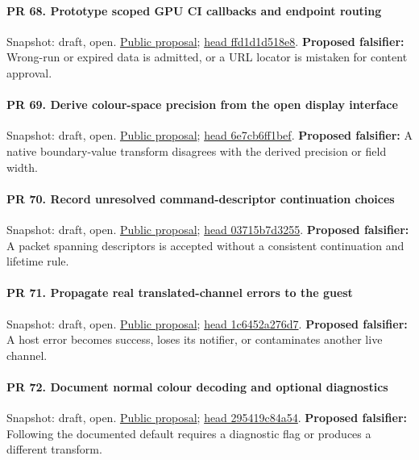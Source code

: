 \paragraph{PR 68. Prototype scoped GPU CI callbacks and endpoint routing}
\readcode Snapshot: draft, open.
\href{\repobase/pull/68}{Public proposal};
\href{\repobase/commit/ffd1d1d518e8550e9b44e070f070ca78e5d37fad}{head ffd1d1d518e8}.
\textbf{Proposed falsifier:} Wrong-run or expired data is admitted, or a URL locator is mistaken for
  content approval.

\paragraph{PR 69. Derive colour-space precision from the open display interface}
\readcode Snapshot: draft, open.
\href{\repobase/pull/69}{Public proposal};
\href{\repobase/commit/6e7cb6ff1befc2c8920a80e615c266901a7044fc}{head 6e7cb6ff1bef}.
\textbf{Proposed falsifier:} A native boundary-value transform disagrees with the derived precision
  or field width.

\paragraph{PR 70. Record unresolved command-descriptor continuation choices}
\readcode Snapshot: draft, open.
\href{\repobase/pull/70}{Public proposal};
\href{\repobase/commit/03715b7d32554995215b477ca24ede10240c5b21}{head 03715b7d3255}.
\textbf{Proposed falsifier:} A packet spanning descriptors is accepted without a consistent
  continuation and lifetime rule.

\paragraph{PR 71. Propagate real translated-channel errors to the guest}
\readcode Snapshot: draft, open.
\href{\repobase/pull/71}{Public proposal};
\href{\repobase/commit/1c6452a276d7014bece3adf42d68cbd4edffbc18}{head 1c6452a276d7}.
\textbf{Proposed falsifier:} A host error becomes success, loses its notifier, or contaminates
  another live channel.

\paragraph{PR 72. Document normal colour decoding and optional diagnostics}
\readcode Snapshot: draft, open.
\href{\repobase/pull/72}{Public proposal};
\href{\repobase/commit/295419c84a542ff2ac1eb428ad5d4ab7cd0800ac}{head 295419c84a54}.
\textbf{Proposed falsifier:} Following the documented default requires a diagnostic flag or produces
  a different transform.


